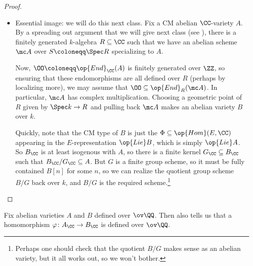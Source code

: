 \documentclass[../notes.tex]{subfiles}
\begin{document}
\begin{proof}
\begin{itemize}
		\item Essential image: we will do this next class. Fix a CM abelian $\CC$-variety $A$. By a spreading out argument that we will give next class (see ), there is a finitely generated $k$-algebra $R\subseteq\CC$ such that we have an abelian scheme $\mc A$ over $S\coloneqq\Spec R$ specializing to $A$.

		Now, $\OO\coloneqq\op{End}_\CC(A)$ is finitely generated over $\ZZ$, so ensuring that these endomorphisms are all defined over $R$ (perhaps by localizing more), we may assume that $\OO\subseteq\op{End}_R(\mc A)$. In particular, $\mc A$ has complex multiplication. Choosing a geometric point of $R$ given by $\Spec k\to R$ and pulling back $\mc A$ makes an abelian variety $B$ over $k$.

		Quickly, note that the CM type of $B$ is just the $\Phi\subseteq\op{Hom}(E,\CC)$ appearing in the $E$-representation $\op{Lie}B$, which is simply $\op{Lie}A$. So $B_\CC$ is at least isogenous with $A$, so there is a finite kernel $G_\CC\subseteq B_\CC$ such that $B_\CC/G_\CC\subseteq A$. But $G$ is a finite group scheme, so it must be fully contained $B[n]$ for some $n$, so we can realize the quotient group scheme $B/G$ back over $k$, and $B/G$ is the required scheme.\footnote{Perhaps one should check that the quotient $B/G$ makes sense as an abelian variety, but it all works out, so we won't bother.}
		\qedhere
	\end{itemize}
\end{proof}
\begin{remark}
	Fix abelian varieties $A$ and $B$ defined over $\ov\QQ$. Then  also tells us that a homomorphism $\varphi\colon A_\CC\to B_\CC$ is defined over $\ov\QQ$.
\end{remark}
\end{document}
